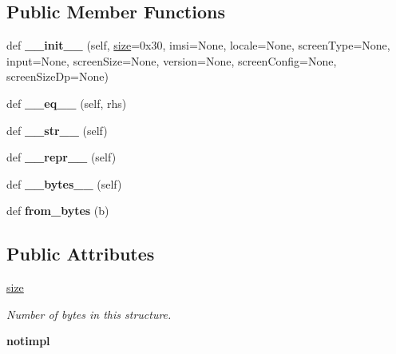 \subsection*{Public Member Functions}
\begin{DoxyCompactItemize}
\item 
\mbox{\label{classarsc_1_1config_1_1ResTable__config_abeba273e971c7a6861f82575398a41e2}} 
def {\bfseries \+\_\+\+\_\+init\+\_\+\+\_\+} (self, \mbox{\hyperlink{classarsc_1_1config_1_1ResTable__config_ae3cb1c93f364aaf270d5aa769e39c210}{size}}=0x30, imsi=\+None, locale=\+None, screen\+Type=\+None, input=\+None, screen\+Size=\+None, version=\+None, screen\+Config=\+None, screen\+Size\+Dp=\+None)
\item 
\mbox{\label{classarsc_1_1config_1_1ResTable__config_a5515a77d3266f7b11b5554e8f8ee00b5}} 
def {\bfseries \+\_\+\+\_\+eq\+\_\+\+\_\+} (self, rhs)
\item 
\mbox{\label{classarsc_1_1config_1_1ResTable__config_a70cd914aa3ae72664c0ab23b89cc4dea}} 
def {\bfseries \+\_\+\+\_\+str\+\_\+\+\_\+} (self)
\item 
\mbox{\label{classarsc_1_1config_1_1ResTable__config_a908ed316a222a4a5f3854de4b00f65c5}} 
def {\bfseries \+\_\+\+\_\+repr\+\_\+\+\_\+} (self)
\item 
\mbox{\label{classarsc_1_1config_1_1ResTable__config_ad1f827a913aec407dcd54e88f5983cab}} 
def {\bfseries \+\_\+\+\_\+bytes\+\_\+\+\_\+} (self)
\item 
\mbox{\label{classarsc_1_1config_1_1ResTable__config_a5c14e9dd0421772a38273442f269c800}} 
def {\bfseries from\+\_\+bytes} (b)
\end{DoxyCompactItemize}
\subsection*{Public Attributes}
\begin{DoxyCompactItemize}
\item 
\mbox{\label{classarsc_1_1config_1_1ResTable__config_ae3cb1c93f364aaf270d5aa769e39c210}} 
\mbox{\hyperlink{classarsc_1_1config_1_1ResTable__config_ae3cb1c93f364aaf270d5aa769e39c210}{size}}
\begin{DoxyCompactList}\small\item\em Number of bytes in this structure. \end{DoxyCompactList}\item 
\mbox{\label{classarsc_1_1config_1_1ResTable__config_a54e0900678c3f396e2742971c962b6f2}} 
{\bfseries notimpl}
\end{DoxyCompactItemize}



